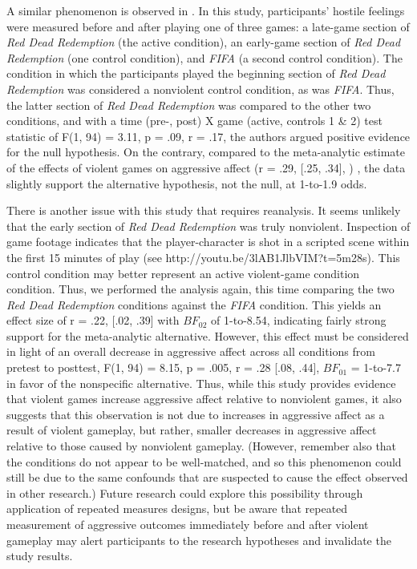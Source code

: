 \documentclass[fignum,nobf,man]{apa}
\begin{document}
A similar phenomenon is observed in \citet{Valadez:Ferguson:2012}. 
In this study, participants' hostile feelings were measured before and after playing one of three games: a late-game section of {\em Red Dead Redemption} (the active condition), an early-game section of {\em Red Dead Redemption} (one control condition), and {\em FIFA} (a second control condition). %
The condition in which the participants played the beginning section of {\em Red Dead Redemption} was considered a nonviolent control condition, as was {\em FIFA}. Thus, the latter section of {\em Red Dead Redemption} was compared to the other two conditions, and with a time (pre-, post) X game (active, controls 1 \& 2) test statistic of F(1, 94) = 3.11, p = .09, r = .17, the authors argued positive evidence for the null hypothesis. On the contrary, compared to the meta-analytic estimate of the effects of violent games on aggressive affect (r = .29, [.25, .34], \citet{Anderson:etal:2010}) %
, the data slightly support the alternative hypothesis, not the null, at 1-to-1.9 odds. 

There is another issue with this study that requires reanalysis. It seems unlikely that the early section of {\em Red Dead Redemption} was truly nonviolent. Inspection of game footage indicates that the player-character is shot in a scripted scene within the first 15 minutes of play (see http://youtu.be/3lAB1JlbVIM?t=5m28s). This control condition may better represent an active violent-game condition condition.  Thus, we performed the analysis again, this time comparing the two {\em Red Dead Redemption} conditions against the {\em FIFA} condition. This yields an effect size of r = .22, [.02, .39]  with  $BF_{02}$ of 1-to-8.54, indicating fairly strong support for the meta-analytic alternative. However, this effect must be considered in light of an overall decrease in aggressive affect across all conditions from pretest to posttest, F(1, 94) = 8.15, p = .005, r = .28 [.08, .44], $BF_{01}$ = 1-to-7.7 in favor of the nonspecific alternative. Thus, while this study provides evidence that violent games increase aggressive affect relative to nonviolent games, it also suggests that this observation is not due to increases in aggressive affect as a result of violent gameplay, but rather, smaller decreases in aggressive affect relative to those caused by nonviolent gameplay. (However, remember also that the conditions do not appear to be well-matched, and so this phenomenon could still be due to the same confounds that are suspected to cause the effect observed in other research.) Future research could explore this possibility through application of repeated measures designs, but be aware that repeated measurement of aggressive outcomes immediately before and after violent gameplay may alert participants to the research hypotheses and invalidate the study results. 
\end{document}
